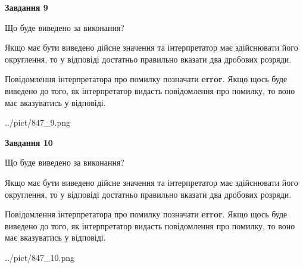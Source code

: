 \documentclass[12pt, ukrainian]{article}
\begin{document}
{\begin {Large}
{\begin {center}\textbf{Завдання 9}\end {center}}\par
Що буде виведено за виконання? \par

Якщо має бути виведено дійсне значення та інтерпретатор має здійснювати його округлення, 
то у відповіді достатньо правильно вказати два дробових розряди.

Повідомлення інтерпретатора про помилку позначати \textbf{error}.
Якщо щось буде виведено до того, як інтерпретатор видасть повідомлення про помилку, 
то воно має вказуватись у відповіді. \par

\begin{center}
	{../pict/847_9.png}
\end{center}
\newpage

{\begin {center}\textbf{Завдання 10}\end {center}}\par
Що буде виведено за виконання? \par

Якщо має бути виведено дійсне значення та інтерпретатор має здійснювати його округлення, 
то у відповіді достатньо правильно вказати два дробових розряди.

Повідомлення інтерпретатора про помилку позначати \textbf{error}.
Якщо щось буде виведено до того, як інтерпретатор видасть повідомлення про помилку, 
то воно має вказуватись у відповіді. \par

\begin{center}
	{../pict/847_10.png}
\end{center}
\newpage

\end {Large}}
\end{document}

